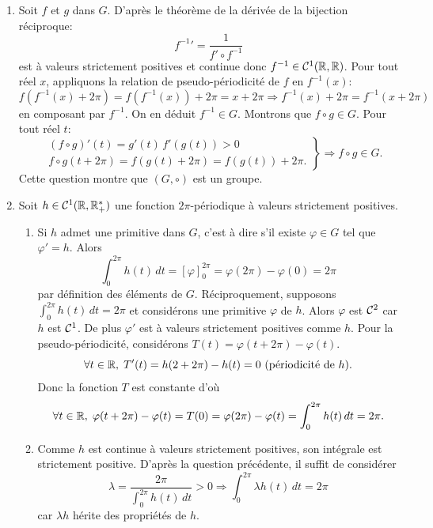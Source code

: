 \begin{enumerate}
\item Soit $f$ et $g$ dans $G$. D'après le théorème de la dérivée de la bijection réciproque:
\[
  {f^{-1}}' = \frac{1}{f'\circ f^{-1}}
\]
est à valeurs strictement positives et continue donc $f^{-1} \in \mathcal{C}^1(\mathbb{R},\mathbb{R})$.\newline
Pour tout réel $x$, appliquons la relation de pseudo-périodicité de $f$ en $f^{-1}(x)$:
\[
  f(f^{-1}(x) + 2\pi) = f(f^{-1}(x)) + 2\pi = x +2\pi \Rightarrow f^{-1}(x) + 2\pi = f^{-1}(x +2\pi)
\]
en composant par $f^{-1}$. On en déduit $f^{-1} \in G$.\newline
Montrons que $f \circ g \in G$. Pour tout réel $t$:
\[
\left.
  \begin{aligned}
&(f\circ g)'(t) = g'(t)\, f'(g(t)) > 0\\ 
&f\circ g( t + 2\pi) = f(g(t) + 2\pi) = f(g(t)) + 2\pi.
  \end{aligned}
  \right\rbrace
  \Rightarrow f \circ g \in G .
\]
Cette question montre que $(G,\circ)$ est un groupe.

\item Soit $h\in \mathcal{C}^{1}(\mathbb{R}, \mathbb{R}_{+}^{*})$ une fonction $2\pi$-périodique à valeurs strictement positives.
\begin{enumerate}
  \item Si $h$ admet une primitive dans $G$, c'est à dire s'il existe $\varphi \in G$ tel que $\varphi' = h$. Alors
\[
  \int_0^{2\pi}h(t)\,dt = \left[ \varphi \right]_0^{2\pi} = \varphi(2\pi) - \varphi(0) = 2\pi
\]
par définition des éléments de $G$.\newline
Réciproquement, supposons $\int_0^{2\pi}h(t)\,dt = 2\pi$ et considérons une primitive $\varphi$ de $h$. Alors $\varphi$ est $\mathcal{C} ^2$ car $h$ est $\mathcal{C}^1$. De plus $\varphi'$ est à valeurs strictement positives comme $h$. Pour la pseudo-périodicité, considérons $T(t) = \varphi(t+2\pi) - \varphi(t)$.
\[
\forall t \in \mathbb{R}, \; T'(t) = h(2+2\pi) - h(t) = 0 \text{ (périodicité de $h$)}.
\]
Donc la fonction $T$ est constante d'où
\[
\forall t \in \mathbb{R},\;  \varphi(t+2\pi) - \varphi(t) = T(0) = \varphi(2\pi) - \varphi(t) = \int_0^{2\pi}h(t)\,dt = 2\pi. 
\]

  \item Comme $h$ est continue à valeurs strictement positives, son intégrale est strictement positive. D'après la question précédente, il suffit de considérer
\[
  \lambda = \frac{2\pi }{\int_0^{2\pi}h(t)\,dt} > 0 \Rightarrow \int_0^{2\pi}\lambda h(t)\,dt = 2\pi
\]
car $\lambda h$ hérite des propriétés de $h$.
\end{enumerate}


\end{enumerate}
